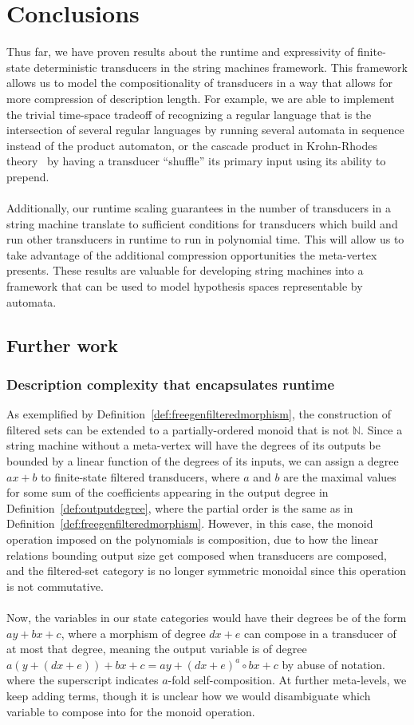 \documentclass{article}
\theoremstyle{definition}
\theoremstyle{remark}
\begin{document}
\section{Conclusions}
Thus far, we have proven results about the runtime and expressivity of
finite-state deterministic transducers in the string machines framework.
This framework allows us to model the compositionality of transducers
in a way that allows for more compression of description length.
For example, we
are able to implement the
trivial time-space tradeoff of recognizing a regular
language that is the intersection of several regular languages by
running several automata in sequence instead of the product automaton,
or the cascade product in Krohn-Rhodes
theory~\cite{krohn1965algebraic} by having a transducer ``shuffle''
its primary input using its ability to prepend.
\\ \\
Additionally, our runtime scaling
guarantees in the number of transducers in 
a string machine translate to sufficient conditions for
transducers which build and run other transducers in runtime to run in
polynomial time.
This will allow
us to take advantage of the additional compression opportunities the
meta-vertex presents.
These results are valuable for developing
string machines into a framework that can be used to model hypothesis
spaces representable by automata.
\subsection{Further work}
\subsubsection{Description complexity that encapsulates runtime}
\label{sec:desccomplex}
As exemplified by Definition~\ref{def:freegenfilteredmorphism},
the construction of filtered sets can be extended to a
partially-ordered monoid that is not $\mathbb{N}$. Since a string
machine without a meta-vertex will have the degrees of its outputs
be bounded by a linear function of the degrees of its inputs, we
can assign a degree $ax+b$ to finite-state
filtered transducers, where $a$ and $b$
are the maximal values for some sum of the coefficients appearing
in the output degree in Definition~\ref{def:outputdegree}, where
the partial order is the same as in 
Definition~\ref{def:freegenfilteredmorphism}. However, in this case,
the monoid operation imposed on the polynomials is composition, due
to how the linear relations bounding output size get composed when
transducers are composed, and the filtered-set category is no
longer symmetric monoidal since this operation is not commutative.
\\ \\
Now, the variables in our
state categories would have their degrees be of the form
$ay+bx+c$, where a morphism of degree $dx+e$ can compose
in a transducer of at most that degree, meaning the output
variable is of degree $a(y+(dx+e))+bx+c=ay+(dx+e)^a \circ
bx+c$ by abuse of notation. where the superscript indicates
$a$-fold self-composition. At further meta-levels, we keep
adding terms, though it is unclear
how we would disambiguate which variable to compose
into for the monoid operation. 
\end{document}
